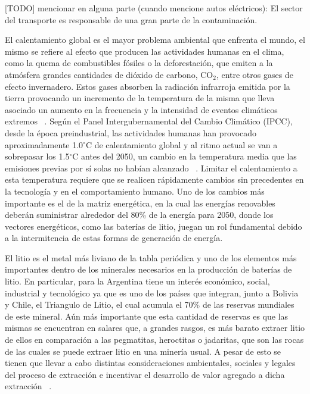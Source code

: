 [TODO] mencionar en alguna parte (cuando mencione autos eléctricos): El sector 
del transporte es responsable de una gran parte de la contaminación.


El calentamiento global es el mayor problema ambiental que enfrenta el mundo, el 
mismo se refiere al efecto que producen las actividades humanas en el clima, como 
la quema de combustibles fósiles o la deforestación, que emiten a la atmósfera
grandes cantidades de dióxido de carbono, CO$_2$, entre otros gases de efecto 
invernadero. Estos gases absorben la radiación infrarroja emitida por la tierra 
provocando un incremento de la temperatura de la misma que lleva asociado un 
aumento en la frecuencia y la intensidad de eventos climáticos extremos 
~\cite{houghton2005}. Según el Panel Intergubernamental del Cambio Climático 
(IPCC), desde la época preindustrial, las actividades humanas han provocado 
aproximadamente 1.0$^{\circ}$C de calentamiento global y al ritmo actual se van 
a sobrepasar los 1.5$^{\circ}$C antes del 2050, un cambio en la temperatura
media que las emisiones previas por sí solas no habían alcanzado
~\cite{harvey2018}. Limitar el calentamiento a esta temperatura requiere que se 
realicen rápidamente cambios sin precedentes en la tecnología y en el 
comportamiento humano. Uno de los cambios más importante es el de la matriz 
energética, en la cual las energías renovables deberán suministrar alrededor del 
80\% de la energía para 2050, donde los vectores energéticos, como las baterías 
de litio, juegan un rol fundamental debido a la intermitencia de estas formas de 
generación de energía.

El litio es el metal más liviano de la tabla periódica y uno de los elementos más
importantes dentro de los minerales necesarios en la producción de baterías de
litio. En particular, para la Argentina tiene un interés económico, social, 
industrial y tecnológico ya que es uno de los países que integran, junto a 
Bolivia y Chile, el Triangulo de Litio, el cual acumula el 70\% de las reservas 
mundiales de este mineral. Aún más importante que esta cantidad de reservas es 
que las mismas se encuentran en salares que, a grandes rasgos, es más barato
extraer litio de ellos en comparación a las pegmatitas, heroctitas o jadaritas, 
que son las rocas de las cuales se puede extraer litio en una minería usual.
A pesar de esto se tienen que llevar a cabo distintas consideraciones ambientales,
sociales y legales del proceso de extracción e incentivar el desarrollo de valor
agregado a dicha extracción ~\cite{heredia2020}.

